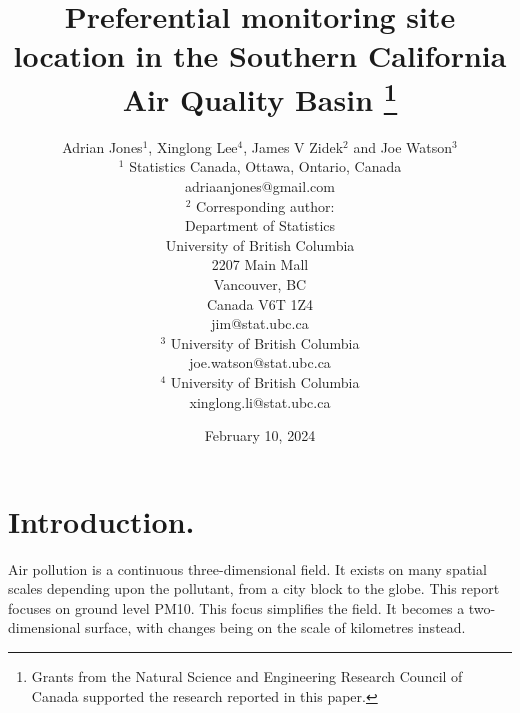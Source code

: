 \documentclass{article}
\begin{document}
	
	\title{Preferential monitoring site location in the Southern California Air Quality Basin
		\thanks{
			Grants from the Natural Science and Engineering Research Council of Canada supported the research reported in this paper.} 
	}
	
	\date{February 10, 2024}
	
	\author{Adrian Jones$^1$, Xinglong Lee$^4$, James V Zidek$^2$ and Joe Watson$^3$\\
		\small
		$^1$ Statistics Canada, Ottawa, Ontario, Canada \\\small
		adriaanjones@gmail.com\\\small
		$^2$ Corresponding author:\\\small
		Department of Statistics\\\small
		University of British Columbia \\\small
		2207 Main Mall\\\small
		Vancouver, BC \\\small
		Canada V6T 1Z4\\\small
		jim@stat.ubc.ca \\\small
		$^3$ University of British Columbia \\\small
		joe.watson@stat.ubc.ca \\\small
		$^4$ University of British Columbia \\\small
		xinglong.li@stat.ubc.ca \\\small
	}
	
	\maketitle
	\tableofcontents
	
	
	
	
	
	\maketitle
	
	
	
	\cleardoublepage
	
	
	
	\section{Introduction.}\label{sec:introduction}
	
	Air pollution is a continuous three-dimensional field.  It exists on many spatial scales depending upon the pollutant, from a city block to the globe.  This report focuses on ground level \ac{PM10}.  This focus simplifies the field. It becomes a two-dimensional surface, with changes being on the scale of kilometres \citep{CFR:Title40-58} instead.   
	
\end{document}
